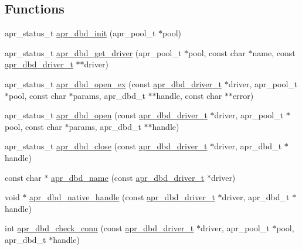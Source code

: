 \subsection*{Functions}
\begin{DoxyCompactItemize}
\item 
apr\-\_\-status\-\_\-t \hyperlink{group___a_p_r___util___d_b_d_ga7969f50d38bda792cbef72136300a574}{apr\-\_\-dbd\-\_\-init} (apr\-\_\-pool\-\_\-t $\ast$pool)
\item 
apr\-\_\-status\-\_\-t \hyperlink{group___a_p_r___util___d_b_d_ga8ba85faccf7e8eea525812f8f2dfed25}{apr\-\_\-dbd\-\_\-get\-\_\-driver} (apr\-\_\-pool\-\_\-t $\ast$pool, const char $\ast$name, const \hyperlink{structapr__dbd__driver__t}{apr\-\_\-dbd\-\_\-driver\-\_\-t} $\ast$$\ast$driver)
\item 
apr\-\_\-status\-\_\-t \hyperlink{group___a_p_r___util___d_b_d_gabddb1fdcb2f8a5f5b83127485c78e8ae}{apr\-\_\-dbd\-\_\-open\-\_\-ex} (const \hyperlink{structapr__dbd__driver__t}{apr\-\_\-dbd\-\_\-driver\-\_\-t} $\ast$driver, apr\-\_\-pool\-\_\-t $\ast$pool, const char $\ast$params, apr\-\_\-dbd\-\_\-t $\ast$$\ast$handle, const char $\ast$$\ast$error)
\item 
apr\-\_\-status\-\_\-t \hyperlink{group___a_p_r___util___d_b_d_gaeff12b01f78ac78721acc4a0a318e673}{apr\-\_\-dbd\-\_\-open} (const \hyperlink{structapr__dbd__driver__t}{apr\-\_\-dbd\-\_\-driver\-\_\-t} $\ast$driver, apr\-\_\-pool\-\_\-t $\ast$pool, const char $\ast$params, apr\-\_\-dbd\-\_\-t $\ast$$\ast$handle)
\item 
apr\-\_\-status\-\_\-t \hyperlink{group___a_p_r___util___d_b_d_ga4abe00d844cd547cc69880fe14af4aca}{apr\-\_\-dbd\-\_\-close} (const \hyperlink{structapr__dbd__driver__t}{apr\-\_\-dbd\-\_\-driver\-\_\-t} $\ast$driver, apr\-\_\-dbd\-\_\-t $\ast$handle)
\item 
const char $\ast$ \hyperlink{group___a_p_r___util___d_b_d_ga7a14e0073a36bd97dd82baa5f20e874c}{apr\-\_\-dbd\-\_\-name} (const \hyperlink{structapr__dbd__driver__t}{apr\-\_\-dbd\-\_\-driver\-\_\-t} $\ast$driver)
\item 
void $\ast$ \hyperlink{group___a_p_r___util___d_b_d_gab2a238e15942e66a2b92836c392d5334}{apr\-\_\-dbd\-\_\-native\-\_\-handle} (const \hyperlink{structapr__dbd__driver__t}{apr\-\_\-dbd\-\_\-driver\-\_\-t} $\ast$driver, apr\-\_\-dbd\-\_\-t $\ast$handle)
\item 
int \hyperlink{group___a_p_r___util___d_b_d_gae3fca3b3c05f835f9849668a338d82d1}{apr\-\_\-dbd\-\_\-check\-\_\-conn} (const \hyperlink{structapr__dbd__driver__t}{apr\-\_\-dbd\-\_\-driver\-\_\-t} $\ast$driver, apr\-\_\-pool\-\_\-t $\ast$pool, apr\-\_\-dbd\-\_\-t $\ast$handle)

\end{DoxyCompactItemize}
